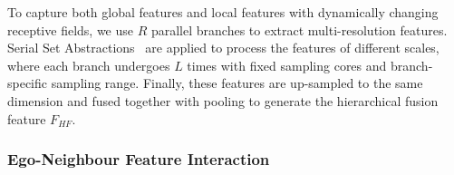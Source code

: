 To capture both global features and local features with dynamically changing receptive fields, we use $R$ parallel branches to extract multi-resolution features.
Serial Set Abstractions~\cite{qi2017pointnet} are applied to process the features of different scales, where each branch undergoes $L$ times with fixed sampling cores and branch-specific sampling range. Finally, these features are up-sampled to the same dimension and fused together with pooling to generate the hierarchical fusion feature $F_{HF}$.

 
\subsubsection{Ego-Neighbour Feature Interaction}

